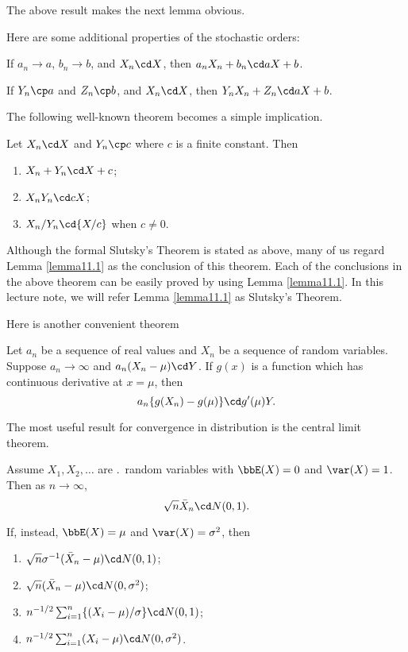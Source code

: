 \vs
The above result makes the next lemma obvious.

\begin{lemma}
Here are some additional properties of the stochastic orders:

If $a_n \to a$, $b_n \to b$,
and $X_n \cd X$, then $a_n X_n + b_n \cd aX+b$.

If $Y_n \cp a $ and $Z_n \cp b$, and $X_n \cd X$, 
then $Y_n X_n + Z_n \cd aX+b$.
\end{lemma}

The following well-known theorem becomes
a simple implication.

\begin{theorem}{\label{Slutsky}}
Let $X_n \cd X$ and $Y_n \cp c$ where $c$ is a finite constant. Then
\begin{enumerate}
\item $X_n+Y_n \cd X+c$;

\item $X_nY_n \cd cX$;

\item ${{X_n}/{Y_n}} \cd {{X}/{c}}$ when $c \neq 0$.
\end{enumerate}
\end{theorem}

Although the formal Slutsky's Theorem is stated as above,
many of us regard Lemma \ref{lemma11.1} as the conclusion
of this theorem. Each of the conclusions in the above theorem
can be easily proved by using Lemma \ref{lemma11.1}.
In this lecture note, we will refer Lemma \ref{lemma11.1}
as Slutsky's Theorem.

Here is another convenient theorem

\begin{theorem}
Let $a_n$ be a sequence of real values and
$X_n$ be a sequence of random variables.
Suppose $a_n \to \infty$ and $a_n(X_n - \mu) \cd Y$.
If $g(x)$ is a function which has continuous derivative
at $x = \mu$, then
\[
a_n\{ g(X_n) - g(\mu)\} \cd g'(\mu) Y.
\]
\end{theorem}

The most useful result for convergence in distribution 
is the central limit theorem. 

\begin{theorem}
Assume $X_1, X_2, \ldots$ are \iid.\ random variables with
$\bbE (X) = 0$ and $\var (X) = 1$. Then as $n \to \infty$,
\[
\sqrt{n}\bar{X}_n \cd N(0,1).
\]

If, instead, $\bbE (X) = \mu$ and $\var(X) = \sigma^2$, then
\begin{enumerate}
\item 
$\sqrt{n} \sigma^{-1} (\bar{X}_n - \mu) \cd N(0,1)$;

\item 
$\sqrt{n}(\bar{X}_n - \mu) \cd N(0, \sigma^2)$;

\item 
$n^{-1/2} \sum_{i=1}^n \{ (X_i - \mu)/\sigma\} \cd N(0,1)$;

\item 
$n^{-1/2} \sum_{i=1}^n (X_i - \mu) \cd N(0,\sigma^2)$.
\end{enumerate}
\end{theorem}

